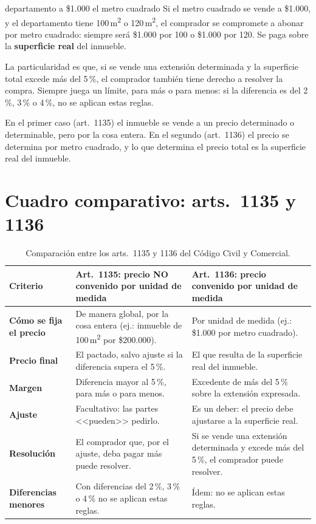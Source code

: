 \documentclass[12pt,oneside]{book}
\begin{document}
\begin{example}{departamento a \$1.000 el metro cuadrado}
Si el metro cuadrado se vende a \$1.000, y el departamento tiene 100\,m\textsuperscript{2} o 120\,m\textsuperscript{2}, el comprador se compromete a abonar por metro cuadrado: siempre ser\'a \$1.000 por 100 o \$1.000 por 120. Se paga sobre la \textbf{superficie real} del inmueble.
\end{example}

La particularidad es que, si se vende una extensi\'on determinada y la superficie total excede m\'as del 5\,\%, el comprador tambi\'en tiene derecho a resolver la compra. Siempre juega un l\'imite, para m\'as o para menos: si la diferencia es del 2\,\%, 3\,\% o 4\,\%, no se aplican estas reglas.

\begin{important}
En el primer caso (art.~1135) el inmueble se vende a un precio determinado o determinable, pero por la cosa entera. En el segundo (art.~1136) el precio se determina por metro cuadrado, y lo que determina el precio total es la superficie real del inmueble.
\end{important}

\section{Cuadro comparativo: arts.~1135 y 1136}

\begin{table}[H]
\centering
\renewcommand{\arraystretch}{1.3}
\begin{tabularx}{\linewidth}{@{}>{\raggedright\arraybackslash}p{2.6cm}>{\raggedright\arraybackslash}X>{\raggedright\arraybackslash}X@{}}
\toprule
\textbf{Criterio} & \textbf{Art.~1135: precio NO convenido por unidad de medida} & \textbf{Art.~1136: precio convenido por unidad de medida} \\
\midrule
\textbf{C\'omo se fija el precio} & De manera global, por la cosa entera (ej.: inmueble de 100\,m\textsuperscript{2} por \$200.000). & Por unidad de medida (ej.: \$1.000 por metro cuadrado). \\
\textbf{Precio final} & El pactado, salvo ajuste si la diferencia supera el 5\,\%. & El que resulta de la superficie real del inmueble. \\
\textbf{Margen} & Diferencia mayor al 5\,\%, para m\'as o para menos. & Excedente de m\'as del 5\,\% sobre la extensi\'on expresada. \\
\textbf{Ajuste} & Facultativo: las partes <<pueden>> pedirlo. & Es un deber: el precio debe ajustarse a la superficie real. \\
\textbf{Resoluci\'on} & El comprador que, por el ajuste, deba pagar m\'as puede resolver. & Si se vende una extensi\'on determinada y excede m\'as del 5\,\%, el comprador puede resolver. \\
\textbf{Diferencias menores} & Con diferencias del 2\,\%, 3\,\% o 4\,\% no se aplican estas reglas. & \'Idem: no se aplican estas reglas. \\
\bottomrule
\end{tabularx}
\caption*{Comparaci\'on entre los arts.~1135 y 1136 del C\'odigo Civil y Comercial.}
\end{table}
\end{document}
